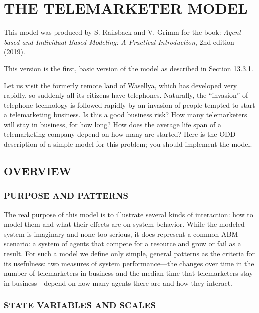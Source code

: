 \documentclass[]{article}
\title{}
\author{}
\date{}
\begin{document}
\hypertarget{the-telemarketer-model}{%
\section{THE TELEMARKETER MODEL}\label{the-telemarketer-model}}

This model was produced by S. Railsback and V. Grimm for the book:
\emph{Agent-based and Individual-Based Modeling: A Practical
Introduction}, 2nd edition (2019).

This version is the first, basic version of the model as described in
Section 13.3.1.

Let us visit the formerly remote land of Wasellya, which has developed
very rapidly, so suddenly all its citizens have telephones. Naturally,
the ``invasion'' of telephone technology is followed rapidly by an
invasion of people tempted to start a telemarketing business. Is this a
good business risk? How many telemarketers will stay in business, for
how long? How does the average life span of a telemarketing company
depend on how many are started? Here is the ODD description of a simple
model for this problem; you should implement the model.

\hypertarget{overview}{%
\subsection{OVERVIEW}\label{overview}}

\hypertarget{purpose-and-patterns}{%
\subsubsection{PURPOSE AND PATTERNS}\label{purpose-and-patterns}}

The real purpose of this model is to illustrate several kinds of
interaction: how to model them and what their effects are on system
behavior. While the modeled system is imaginary and none too serious, it
does represent a common ABM scenario: a system of agents that compete
for a resource and grow or fail as a result. For such a model we define
only simple, general patterns as the criteria for its usefulness: two
measures of system performance---the changes over time in the number of
telemarketers in business and the median time that telemarketers stay in
business---depend on how many agents there are and how they interact.

\hypertarget{state-variables-and-scales}{%
\subsubsection{STATE VARIABLES AND
SCALES}\label{state-variables-and-scales}}
\end{document}
